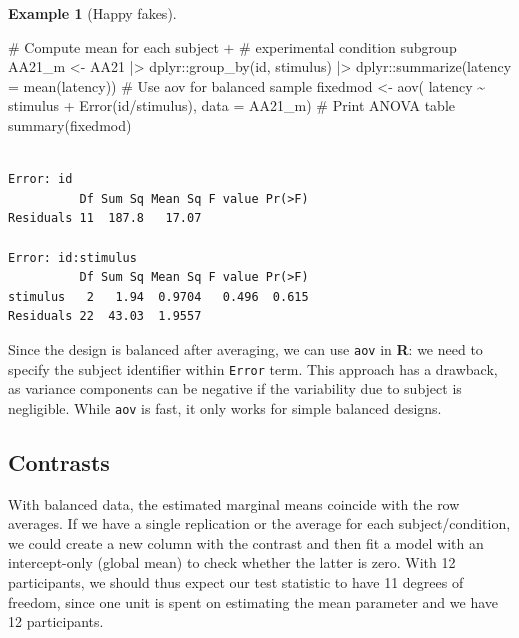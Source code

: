 \documentclass[
  11pt,
  letterpaper,
]{scrbook}
\newenvironment{Shaded}{\begin{snugshade}}{\end{snugshade}}
\newcommand{\AttributeTok}[1]{\textcolor[rgb]{0.40,0.45,0.13}{#1}}
\newcommand{\CommentTok}[1]{\textcolor[rgb]{0.37,0.37,0.37}{#1}}
\newcommand{\FunctionTok}[1]{\textcolor[rgb]{0.28,0.35,0.67}{#1}}
\newcommand{\NormalTok}[1]{\textcolor[rgb]{0.00,0.23,0.31}{#1}}
\newcommand{\OtherTok}[1]{\textcolor[rgb]{0.00,0.23,0.31}{#1}}
\newcommand{\SpecialCharTok}[1]{\textcolor[rgb]{0.37,0.37,0.37}{#1}}
\theoremstyle{definition}
\theoremstyle{definition}
\newtheorem{example}{Example}[chapter]
\theoremstyle{remark}
\begin{document}
\begin{example}[Happy
fakes]
\begin{Shaded}
\begin{Highlighting}[]
\CommentTok{\# Compute mean for each subject + }
\CommentTok{\# experimental condition subgroup}
\NormalTok{AA21\_m }\OtherTok{\textless{}{-}}\NormalTok{ AA21 }\SpecialCharTok{|\textgreater{}}
\NormalTok{  dplyr}\SpecialCharTok{::}\FunctionTok{group\_by}\NormalTok{(id, stimulus) }\SpecialCharTok{|\textgreater{}}
\NormalTok{  dplyr}\SpecialCharTok{::}\FunctionTok{summarize}\NormalTok{(}\AttributeTok{latency =} \FunctionTok{mean}\NormalTok{(latency))}
\CommentTok{\# Use aov for balanced sample}
\NormalTok{fixedmod }\OtherTok{\textless{}{-}} \FunctionTok{aov}\NormalTok{(}
\NormalTok{  latency }\SpecialCharTok{\textasciitilde{}}\NormalTok{ stimulus }\SpecialCharTok{+} \FunctionTok{Error}\NormalTok{(id}\SpecialCharTok{/}\NormalTok{stimulus), }
  \AttributeTok{data =}\NormalTok{ AA21\_m)}
\CommentTok{\# Print ANOVA table}
\FunctionTok{summary}\NormalTok{(fixedmod)}
\end{Highlighting}
\end{Shaded}

\begin{verbatim}

Error: id
          Df Sum Sq Mean Sq F value Pr(>F)
Residuals 11  187.8   17.07               

Error: id:stimulus
          Df Sum Sq Mean Sq F value Pr(>F)
stimulus   2   1.94  0.9704   0.496  0.615
Residuals 22  43.03  1.9557               
\end{verbatim}

Since the design is balanced after averaging, we can use \texttt{aov} in
\textbf{R}: we need to specify the subject identifier within
\texttt{Error} term. This approach has a drawback, as variance
components can be negative if the variability due to subject is
negligible. While \texttt{aov} is fast, it only works for simple
balanced designs.

\end{example}

\subsection{Contrasts}\label{contrasts-1}

With balanced data, the estimated marginal means coincide with the row
averages. If we have a single replication or the average for each
subject/condition, we could create a new column with the contrast and
then fit a model with an intercept-only (global mean) to check whether
the latter is zero. With 12 participants, we should thus expect our test
statistic to have 11 degrees of freedom, since one unit is spent on
estimating the mean parameter and we have 12 participants.
\end{document}
